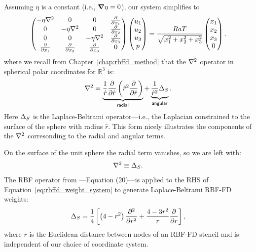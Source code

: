 Assuming $\eta$ is a constant (i.e., $\mbox{\boldmath$ \nabla $} \eta = 0$), our system simplifies to
\begin{align}
\begin{pmatrix}
-\eta \Laplacian & 0 & 0 & \pd{}{x_1} \\ 
0 & -\eta \Laplacian & 0 & \pd{}{x_2} \\ 
0 & 0 & -\eta \Laplacian & \pd{}{x_3} \\ 
\pd{}{x_1} & \pd{}{x_2} & \pd{}{x_3} & 0 \\
\end{pmatrix} \begin{pmatrix}
u_1 \\ u_2 \\ u_3 \\ p 
\end{pmatrix} = \frac{RaT}{\sqrt{x_1^2 + x_2^2 + x_3^2}}\begin{pmatrix} x_1 \\ x_2 \\ x_3 \\ 0\end{pmatrix}.
\label{eq:stokes_constant_viscosity}
\end{align}
where we recall from Chapter~\ref{chap:rbffd_method} that the $\Laplacian$ operator in spherical polar coordinates for $\mathbb{R}^3$ is: 
\begin{align*} 
\Laplacian = \underbrace{\frac{1}{\hat{r}} \pd{}{\hat{r}} \left( \hat{r}^{2} \pd{}{\hat{r}}  \right)}_{\mathsf{radial}} + \underbrace{\frac{1}{\hat{r}^2} \Delta_{S}}_{\mathsf{angular}}. %
\end{align*}
Here $\LaplaceBeltrami$ is the Laplace-Beltrami operator---i.e., the Laplacian constrained to the surface of the sphere with radius $\hat{r}$. This form nicely illustrates the components of the $\Laplacian$ corresonding to the radial and angular terms. 

On the surface of the unit sphere the radial term vanishes, so we are left with:
\begin{align*}
\nabla^2 \equiv \Delta_S . 
\end{align*}
The RBF operator from \cite{WrightFlyerYuen10}---Equation (20)---is applied to the RHS of Equation~\ref{eq:rbffd_weight_system} to generate Laplace-Beltrami RBF-FD weights: 
\begin{align*} 
\Delta_S = \frac{1}{4} \left[ \left(4-r^2\right) \frac{\partial^2 }{\partial r^2} + \frac{4-3r^2}{r} \frac{\partial }{\partial r} \right],
\end{align*} 
where $r$ is the Euclidean distance between nodes of an RBF-FD stencil and is independent of our choice of coordinate system. 


